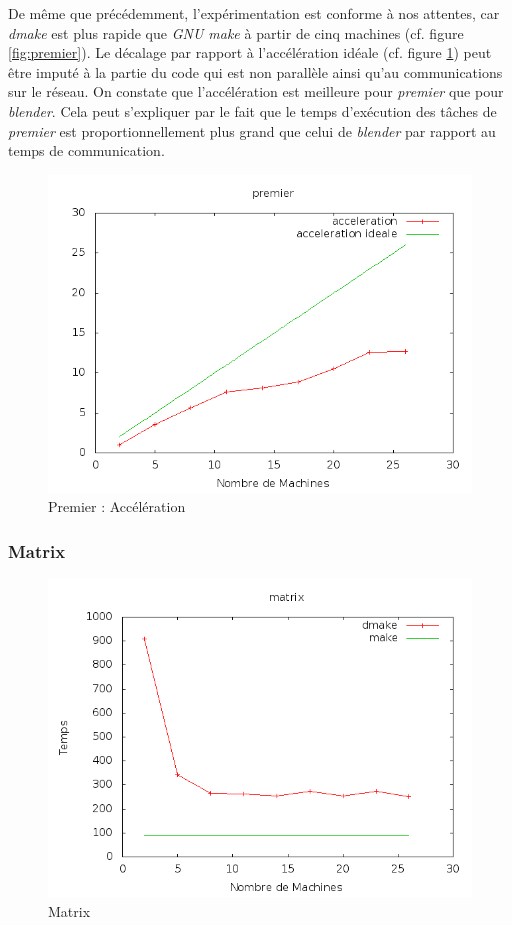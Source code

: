 \documentclass[a4paper,12pt,twoside]{article}
\begin{document}
De même que précédemment, l'expérimentation est conforme à nos attentes, 
car \emph{dmake} est plus rapide que \emph{GNU make} à  partir de cinq machines (cf. figure \ref{fig:premier}). Le décalage par rapport à l'accélération idéale (cf. figure \ref{fig:premierAcc}) peut
être imputé à la partie du code qui est non parallèle ainsi qu'au communications sur le réseau. 
On constate que l'accélération est meilleure pour \emph{premier} que pour \emph{blender}. Cela peut s'expliquer par le fait que le temps d'exécution des tâches de \emph{premier} est proportionnellement plus grand que celui de  \emph{blender} par rapport au temps de communication.

\begin{figure}[h]
  \centering
  \includegraphics[scale=0.5]{acceleration_premier.png}
  \caption{Premier : Accélération}
  \label{fig:premierAcc}
\end{figure}

\subsubsection{Matrix}

\begin{figure}[h]
  \centering
  \includegraphics[scale=0.5]{graph_matrix.png}
  \caption{Matrix}
  \label{fig:matrix}
\end{figure}
\end{document}
